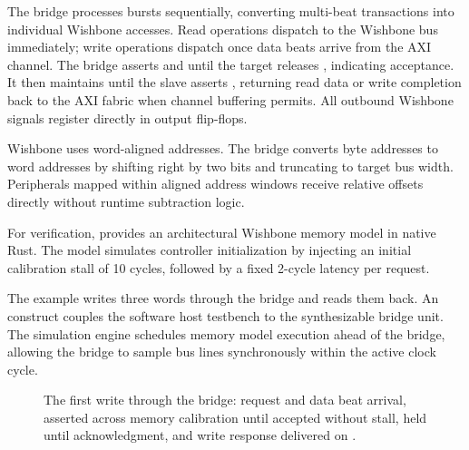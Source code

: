 \documentclass[journal,9pt]{IEEEtran}
\newcommand{\simwbpart}[3]{%
}
\begin{document}


The bridge processes bursts sequentially, converting multi-beat transactions
into individual Wishbone accesses. Read operations dispatch to the Wishbone
bus immediately; write operations dispatch once data beats arrive from the
AXI channel. The bridge asserts  and  until the target
releases , indicating acceptance. It then maintains 
until the slave asserts , returning read data or write completion
back to the AXI fabric when channel buffering permits. All outbound Wishbone
signals register directly in output flip-flops.



Wishbone uses word-aligned addresses. The bridge converts byte addresses to
word addresses by shifting right by two bits and truncating to target bus
width. Peripherals mapped within aligned address windows receive relative
offsets directly without runtime subtraction logic.

For verification,  provides an architectural
Wishbone memory model in native Rust. The model simulates controller
initialization by injecting an initial calibration stall of 10 cycles,
followed by a fixed 2-cycle latency per request.

\simwbpart{mem}{The Wishbone memory, from
\code{lib/parts/src/bus/wb/sim.rs}.}{lst:a-wbmem}

The example  writes three words through the bridge and reads
them back. An  construct couples the software host
testbench to the synthesizable bridge unit. The simulation engine schedules
memory model execution ahead of the bridge, allowing the bridge to sample bus
lines synchronously within the active clock cycle.

\begin{figure}[t]
\centering

\caption{The first write through the bridge: request and data beat arrival,
 asserted across memory calibration until accepted without stall,
 held until acknowledgment, and write response delivered on
.}
\label{fig:a-wb}
\end{figure}
\end{document}
